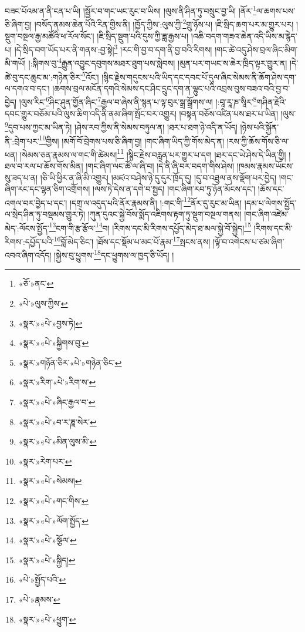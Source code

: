 བཟང་པོའམ་ན་ནི་ངན་པ་ཡི། །སྦྱོར་བ་གང་ཡང་རུང་བ་ཡིས། །ལུས་ནི་ཤིན་ཏུ་བསྲུང་བྱ་ཡི། །ནོར་\footnote{«ཅོ་»ནང་}ལ་ཆགས་པས་ཅི་ཞིག་བྱ། །བསོད་ནམས་ཆེན་པོའི་རིན་གྱིས་ནི། །ཁྱོད་ཀྱིས་:ལུས་ཀྱི་\footnote{«པེ་»ལུས་ཀྱིས་}གྲུ་ཉོས་པ། །ཇི་སྲིད་ཆག་པར་མ་གྱུར་པར། །སྡུག་བསྔལ་རྒྱ་མཚོའི་ཕ་རོལ་སོང་། །ཇི་སྲིད་སྡུག་པའི་དུས་ཀྱི་ཟླ་རྒྱས་པ། །འཆི་བདག་གཟའ་ཆེན་འདི་ཡིས་མ་རྙེད་པ། །དེ་སྲིད་བག་ཡོད་པར་ནི་གནས་:བྱ་སྟེ།\footnote{«སྣར་»«པེ་»བྱས་ཏེ།} །རང་གི་བྱ་བ་དག་ནི་བྱ་བའི་རིགས། །གང་ཚེ་འདུ་ཤེས་བྲལ་ཞིང་མིག་མི་གཡོ། །:སྐིགས་བུ་\footnote{«སྣར་»«པེ་»སྐྱིགས་བུ་}རྒྱུན་འབྱུང་དབུགས་མཐར་ཐུག་པས་སླེབས། །མུན་པར་གཡང་ས་ཆེར་ཁྲིད་ལྟར་གྱུར་ན། །དེ་ཚེ་བུ་དང་ཆུང་མ་:གཉེན་ཅིར་\footnote{«སྣར་»གཉོན་ཅིར་«པེ་»གཉེན་ཅིང་}འོང་། །སྙིང་རྗེས་གདུངས་པའི་ཡིད་དང་དབང་པོ་དུལ་ཞིང་སེམས་ནི་ཆོག་ཤེས་དག་ལ་དགའ་བ་དང་། །ཆགས་བྲལ་མངོན་དགའི་སེམས་དང་ཤིང་དྲུང་དག་ན་ལྷུང་པའི་འབྲས་བུས་བཟའ་བའི་བྱ་བ་བྱེད། །ལུས་རིང་\footnote{«སྣར་»རིག་«པེ་»རིག་ས་}ཤིང་ཤུན་གྱོན་ཞིང་\footnote{«སྣར་»«པེ་»ཞིང་རྒྱལ་བ་}རྒྱལ་བ་ཞེས་ནི་སྙན་པ་ལྟ་བུར་སྒྲ་སྒྲོགས་ལ། །:བཱ་རཱ་ཎ་སཱིར་\footnote{«སྣར་»«པེ་»བ་ར་ཎཱ་སེར་}གཤིན་རྗེའི་དབང་གྱུར་བཅོམ་པའི་ལུས་ཆིག་འདི་ནི་ནམ་ཞིག་སྤོང་བར་འགྱུར། །བསྟན་བཅོས་འཛིན་པས་ཐར་པ་ཡིན། །ལུས་\footnote{«སྣར་»«པེ་»མིན་ལུས་མི་}དུབ་པས་ཀྱང་མ་ཡིན་ཏེ། །ཤེས་རབ་ཀྱིས་ནི་སེམས་བཏུལ་ན། །ཐར་པ་ཐག་ཉེ་འདི་ན་ཡོད། །ཉེས་པའི་སྐྱོན་ནི་:བྲེག་པར་\footnote{«སྣར་»རེག་པར་}གྱིས། །མགོ་བོ་བྲེགས་པས་ཅི་ཞིག་བྱ། །གང་ཞིག་ཡིད་ཀྱི་གོས་མེད་ན། །རས་ཀྱི་ཆོས་གོས་ཅི་ལ་ཕན། །སེམས་ཅན་རྣམས་ལ་གང་གི་ཚེམས།\footnote{«སྣར་»«པེ་»སེམས།} །སྙིང་རྗེས་བརླན་པར་གྱུར་པ་དག །ཐར་དང་ཡེ་ཤེས་དེ་ཡིན་གྱི། །ཐལ་བ་རལ་པ་ཆོས་གོས་མིན། །གང་ཞིག་ལང་ཚོ་ལ་ཞི་བ། །དེ་ནི་ཞི་བར་བདག་གིས་ཤེས། །ཁམས་རྣམས་ཡོངས་སུ་ཟད་པ་ན། །ཅི་ཡི་ཕྱིར་ན་ཞི་མི་འགྱུར། །མཛའ་བཤེས་ཉེ་དུ་དུར་ཁྲོད་དུ། །དུ་བ་འཐུལ་ནས་ལྡོག་པར་བྱེད། །གང་ཞིག་རང་དང་ལྷན་ཅིག་འགྲོགས། །ལས་ཏེ་དེས་ན་དགེ་བ་སྤྱད། །གང་ཞིག་རབ་ཏུ་ཉོན་མོངས་དང་། །ཆོས་དང་འགལ་བར་བྱེད་པ་དང་། །དགྲ་ལ་འདུད་པའི་ནོར་རྣམས་ནི། །:གང་གི་\footnote{«སྣར་»«པེ་»གང་གིས་}ནོར་དུ་རུང་མ་ཡིན། །དམ་པ་ལེགས་སྤྱོད་ལ་སྲེད་ཤིན་ཏུ་བསྡམས་གྱུར་ཏེ། །ཀུན་དུའང་སྐྱེ་བོས་སྨོད་འཇིགས་རྟག་ཏུ་སྡུག་བསྔལ་གནས། །གང་ཞིག་འཛེམ་མེད་:ལོངས་སྤྱོད་\footnote{«སྣར་»«པེ་»ལོག་སྤྱོད་}ངག་གི་རྩ་རྩོལ་\footnote{«སྣར་»«པེ་»སྩོལ་}བ། །རིགས་དང་མི་རིགས་དཔྱོད་མེད་ཐ་མལ་སྐྱེ་བོ་སྐྱེད།\footnote{«སྣར་»«པེ་»སྐྱིད།} །རིགས་དང་མི་རིགས་:དཔྱོད་པའི་\footnote{«པེ་»སྤྱོད་པའི་}བློ་མེད་ཅིང་། །ཐོས་དང་སྡོམ་པ་མང་པོ་རྣམ་\footnote{«པེ་»རྣམས་}སྤངས་ནས། །ལྟོ་བ་འགེངས་པ་ཙམ་ཞིག་འབའ་ཞིག་འདོད། །སྐྱེས་བུ་ཕྱུགས་\footnote{«སྣར་»«པེ་»ཕྱུག་}དང་ཕྱུགས་ལ་ཁྱད་ཅི་ཡོད། །
